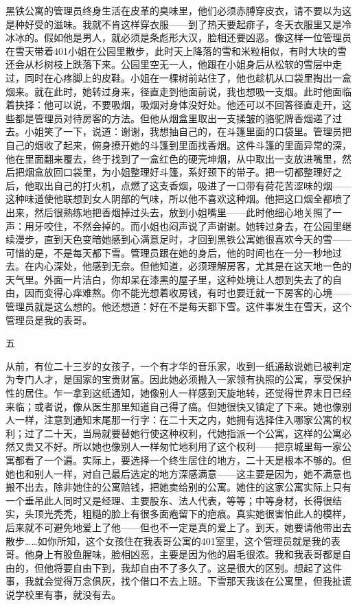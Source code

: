 黑铁公寓的管理员终身生活在皮革的臭味里，他们必须赤膊穿皮衣，请不要以为这是种好受的滋味。我就不肯这样穿衣服——到了热天要起痱子，冬天衣服里又是冷冰冰的。假如他是男人，就必须是条彪形大汉，脸相还要凶恶。像这样一位管理员在雪天带着401小姐在公园里散步，此时天上降落的雪和米粒相似，有时大块的雪还会从杉树枝上跌落下来。公园里空无一人，他跟在小姐身后从松软的雪层中走过，同时在心疼脚上的皮鞋。小姐在一棵树前站住了，他也趁机从口袋里掏出一盒烟来。就在此时，她转过身来，径直走到他面前说，我也想吸一支烟。此时他面临着抉择：他可以说，不要吸烟，吸烟对身体没好处。他还可以不回答径直走开，这些都是管理员对待房客的方法。但他从烟盒里取出一支揉皱的骆驼牌香烟递了过去。小姐笑了一下，说道：谢谢，我想抽自己的，在斗篷里面的口袋里。管理员把自己的烟收了起来，俯身撩开她的斗篷到里面找香烟。这件斗篷的里面异常的深，他在里面翻来覆去，终于找到了一盒红色的硬壳坤烟，从中取出一支放进嘴里，然后把烟盒放回口袋里，为小姐整理好斗篷，系好颈下的带子。把一切都整理好之后，他取出自己的打火机，点燃了这支香烟，吸进了一口带有荷花苦涩味的烟——这种味道使他联想到女人阴部的气味，所以他不喜欢这种烟。他把这口烟全都喷了出来，然后很熟练地把香烟掉过头去，放到小姐嘴里——此时他细心地关照了一声：用牙咬住，不然会掉的。而小姐也闷声说了声谢谢。她转过身去，在公园里继续漫步，直到天色变暗她感到心满意足时，才回到黑铁公寓她很喜欢今天的雪——可惜的是，不是每天都下雪。管理员跟在她的身后，他的时间也在一分一秒地过去。在内心深处，他感到无奈。但他知道，必须理解房客，尤其是在这天地一色的天气里。外面一片洁白，你却呆在漆黑的屋子里，这种处境让人想到失去了的自由，因而变得心痒难熬。你不能光想着收房钱，有时也要迁就一下房客的心境——管理员就是这么想的。他还想道：好在不是每天都下雪。这件事发生在雪天，这个管理员是我的表哥。 



五 

从前，有位二十三岁的女孩子，一个有才华的音乐家，收到一纸通敌说她已被判定为专门人才，是国家的宝贵财富。因此她必须搬入一家领有执照的公寓，享受保护性的居住。乍一拿到这纸通知，她像别人一样感到天旋地转，还觉得世界末日已经来临；或者说，像从医生那里知道自己得了癌。但她很快又镇定了下来。她也像别人一样，注意到通知末尾那一行字：在二十天之内，她拥有选择住入哪家公寓的权利；过了二十天，当局就要替她行使这种权利，代她指派一个公寓，这样的公寓必然又贵又不好。所以她也像别人一样匆忙地利用了这个权利——把京城里每一家公寓都看了一个遍。实际上，要选择一个终生居住的地方，二十天是根本不够的。但她也和别人一样，对自己最后选定的地方深感满意——这主要是因为，她不满意也搬不出去，除非她住的公寓赔钱，把她卖给别的公寓。她住的这家公寓实际上只有一个垂吊此人同时又是经理、主要股东、法人代表，等等；中等身材，长得很结实，头顶光秃秃，粗糙的脸上有很多面疱留下的疤痕。真实她很害怕此人的模样，后来就不可避免地爱上了他——但也不一定是真的爱上了。到天，她要请他带出去散步……如你所知，这个女孩住在我表哥公寓的401室里，这个管理员就是我的表哥。他身上有股鱼腥味，脸相凶恶，主要是因为他的眉毛很浓。我和我表哥都是自由的，但他将要自由下到，我却自由不了多久了。这是很大的区别。想起了这件事，我就会觉得万念俱灰，找个借口不去上班。下雪那天我该在公寓里，但我扯谎说学校里有事，就没有去。 

